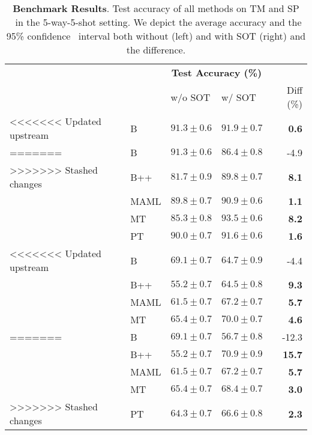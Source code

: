 \begin{table}[h]
\caption{\textbf{Benchmark Results}. Test accuracy of all methods on TM and SP     \ in the 5-way-5-shot setting. We depict the average accuracy and the 95\% confidence      \ interval both without (left) and with SOT (right) and the difference.}
\label{tab:tuned-benchmark}
\vspace{3.5pt}
\centering
\begin{tabular}{llllr}
\toprule
& & \multicolumn{2}{c}{\textbf{Test Accuracy (\%)}} &  \\
 &  & w/o SOT & w/ SOT & Diff (\%) \\
\midrule
<<<<<<< Updated upstream
\multirow[c]{5}{*}{TM} & B & $\mathbf{91.3 \pm 0.6}$ & $91.9 \pm 0.7$ & \bfseries \color{teal} 0.6 \\
=======
\multirow[c]{5}{*}{TM} & B & $\mathbf{91.3 \pm 0.6}$ & $86.4 \pm 0.8$ & \color{red} -4.9 \\
>>>>>>> Stashed changes
 & B++ & $81.7 \pm 0.9$ & $89.8 \pm 0.7$ & \bfseries \color{teal} 8.1 \\
 & MAML & $89.8 \pm 0.7$ & $90.9 \pm 0.6$ & \bfseries \color{teal} 1.1 \\
 & MT & $85.3 \pm 0.8$ & $\mathbf{93.5 \pm 0.6}$ & \bfseries \color{teal} 8.2 \\
 & PT & $90.0 \pm 0.7$ & $91.6 \pm 0.6$ & \bfseries \color{teal} 1.6 \\
\midrule
<<<<<<< Updated upstream
\multirow[c]{5}{*}{SP} & B & $\mathbf{69.1 \pm 0.7}$ & $64.7 \pm 0.9$ & \color{red} -4.4 \\
 & B++ & $55.2 \pm 0.7$ & $64.5 \pm 0.8$ & \bfseries \color{teal} 9.3 \\
 & MAML & $61.5 \pm 0.7$ & $67.2 \pm 0.7$ & \bfseries \color{teal} 5.7 \\
 & MT & $65.4 \pm 0.7$ & $\mathbf{70.0 \pm 0.7}$ & \bfseries \color{teal} 4.6 \\
=======
\multirow[c]{5}{*}{SP} & B & $\mathbf{69.1 \pm 0.7}$ & $56.7 \pm 0.8$ & \color{red} -12.3 \\
 & B++ & $55.2 \pm 0.7$ & $\mathbf{70.9 \pm 0.9}$ & \bfseries \color{teal} 15.7 \\
 & MAML & $61.5 \pm 0.7$ & $67.2 \pm 0.7$ & \bfseries \color{teal} 5.7 \\
 & MT & $65.4 \pm 0.7$ & $68.4 \pm 0.7$ & \bfseries \color{teal} 3.0 \\
>>>>>>> Stashed changes
 & PT & $64.3 \pm 0.7$ & $66.6 \pm 0.8$ & \bfseries \color{teal} 2.3 \\
\bottomrule
\end{tabular}
\end{table}